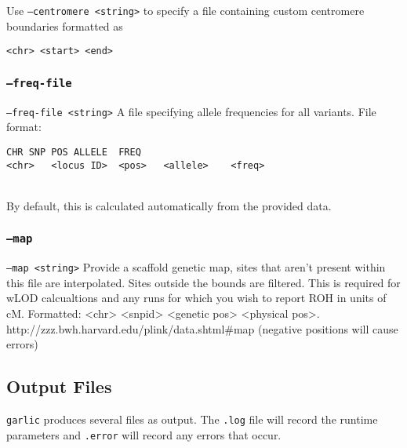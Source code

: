 \documentclass[12pt]{article}%
\begin{document}
Use {\tt --centromere <string>} to specify a file containing custom centromere boundaries formatted as
\begin{lstlisting}
<chr> <start> <end>
\end{lstlisting}

\subsubsection{{\tt --freq-file}}

{\tt --freq-file <string>} A file specifying allele frequencies for all variants. File format:
\begin{lstlisting}
CHR	SNP	POS	ALLELE	FREQ 
<chr>	<locus ID>	<pos>	<allele>	<freq>
\end{lstlisting}
~\\
\noindent By default, this is calculated automatically from the provided data.

\subsubsection{{\tt --map}}

{\tt --map <string>} Provide a scaffold genetic map, sites that aren't present within this file are interpolated.  Sites outside the bounds are filtered. This is required for wLOD calcualtions and any runs for which you wish to report ROH in units of cM. 
Formatted: <chr> <snpid> <genetic pos> <physical pos>. http://zzz.bwh.harvard.edu/plink/data.shtml\#map (negative positions will cause errors)

\subsection{Output Files}

{\tt garlic} produces several files as output.  The {\tt .log} file will record the runtime parameters and {\tt .error} will record any errors that occur.  
\end{document}
